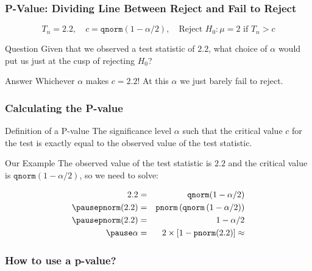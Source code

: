 \begin{frame}
  \frametitle{P-Value: Dividing Line Between Reject and Fail to Reject}

  \vspace{-2em}

  \[\boxed{T_n = 2.2, \quad c = \texttt{qnorm}(1 -\alpha/2), \quad \mbox{Reject } H_0\colon \mu = 2 \mbox{ if } T_n > c}\]

  \begin{block}{Question}
    Given that we observed a test statistic of $2.2$, what choice of $\alpha$ would put us \alert{just at the cusp} of rejecting $H_0$? 
  \end{block}

  \pause

  \begin{alertblock}{Answer}
    Whichever $\alpha$ makes $c = 2.2$!
    At this $\alpha$ we just \alert{barely} fail to reject.
  \end{alertblock}


\end{frame}
\begin{frame}
  \frametitle{Calculating the P-value}

  \begin{block}{Definition of a P-value}
    The significance level $\alpha$ such that the critical value $c$ for the test is \alert{exactly equal} to the observed value of the test statistic. 
  \end{block}

  \pause

  \begin{block}{Our Example}
    The observed value of the test statistic is $2.2$ and the critical value is $\texttt{qnorm}(1 - \alpha/2)$, so we need to solve:

    \vspace{-1em}

    \small
    \begin{eqnarray*}
      2.2 &=&  \texttt{qnorm}(1 - \alpha/2)\\ \pause
      \texttt{pnorm}(2.2) &=&  \texttt{pnorm}\left( \texttt{qnorm}\left( 1 - \alpha/2 \right) \right) \\ \pause
      \texttt{pnorm}(2.2) &=&  1 - \alpha/2\\ \pause
      \alpha &=& 2 \times \left[ 1 - \texttt{pnorm}(2.2) \right] \approx
    \end{eqnarray*}
  \end{block}



\end{frame}
\begin{frame}
  \frametitle{How to use a p-value?}
\end{frame}
